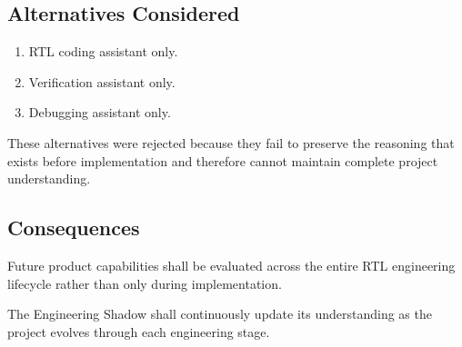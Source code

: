 \subsection*{Alternatives Considered}

\begin{enumerate}
    \item RTL coding assistant only.
    \item Verification assistant only.
    \item Debugging assistant only.
\end{enumerate}

These alternatives were rejected because they fail to preserve the reasoning that exists before implementation and therefore cannot maintain complete project understanding.

\subsection*{Consequences}

Future product capabilities shall be evaluated across the entire RTL engineering lifecycle rather than only during implementation.

The Engineering Shadow shall continuously update its understanding as the project evolves through each engineering stage.